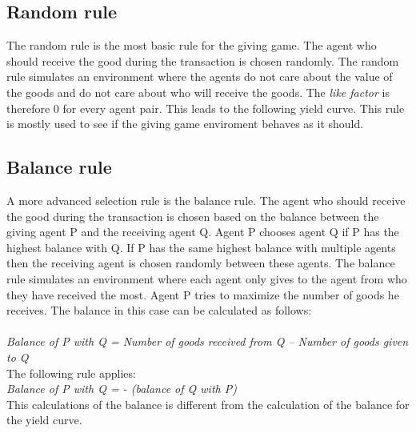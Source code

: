 \documentclass[twoside,openright]{uva-bachelor-thesis}
\begin{document}
\subsection{Random rule}
The random rule is the most basic rule for the giving game. The agent who should receive the good during the transaction is chosen randomly. The random rule simulates an environment where the agents do not care about the value of the goods and do not care about who will receive the goods. The \textit{like factor} is therefore 0 for every agent pair. This leads to the following yield curve. This rule is mostly used to see if the giving game enviroment behaves as it should.

\subsection{Balance rule}
A more advanced selection rule is the balance rule. The agent who should receive the good during the transaction is chosen based on the balance between the giving agent P and the receiving agent Q. Agent P chooses agent Q if P has the highest balance with Q. If P has the same highest balance with multiple agents then the receiving agent is chosen randomly between these agents. The balance rule simulates an environment where each agent only gives to the agent from who they have received the most. Agent P tries to maximize the number of goods he receives. The balance in this case can be calculated as follows: 
\\
\\
\textit{Balance of P with Q = Number of goods received from Q – Number of goods given to Q} \\
The following rule applies:\\
\textit{Balance of P with Q = - (balance of Q with P)}\\
This calculations of the balance is different from the calculation of the balance for the yield curve.\\
\end{document}
